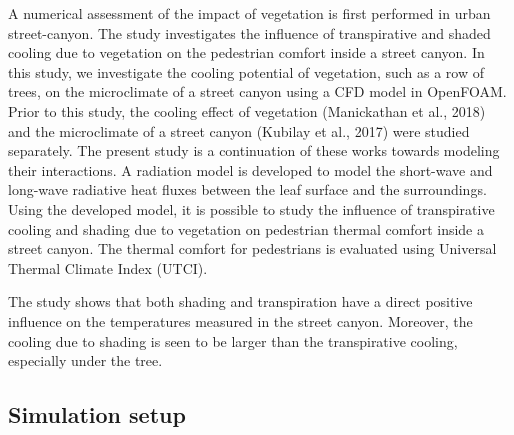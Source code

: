 A numerical assessment of the impact of vegetation is first performed in urban street-canyon. The study investigates the influence of transpirative and shaded cooling due to vegetation on the pedestrian comfort inside a street canyon. In this study, we investigate the cooling potential of vegetation, such as a row of trees, on the microclimate of a street canyon using a CFD model in OpenFOAM. Prior to this study, the cooling effect of vegetation (Manickathan et al., 2018) and the microclimate of a street canyon (Kubilay et al., 2017) were studied separately. The present study is a continuation of these works towards modeling their interactions. A radiation model is developed to model the short-wave and long-wave radiative heat fluxes between the leaf surface and the surroundings. Using the developed model, it is possible to study the influence of transpirative cooling and shading due to vegetation on pedestrian thermal comfort inside a street canyon. The thermal comfort for pedestrians is evaluated using Universal Thermal Climate Index (UTCI). 

The study shows that both shading and transpiration have a direct positive influence on the temperatures measured in the street canyon. Moreover, the cooling due to shading is seen to be larger than the transpirative cooling, especially under the tree.

\subsection{Simulation setup}

